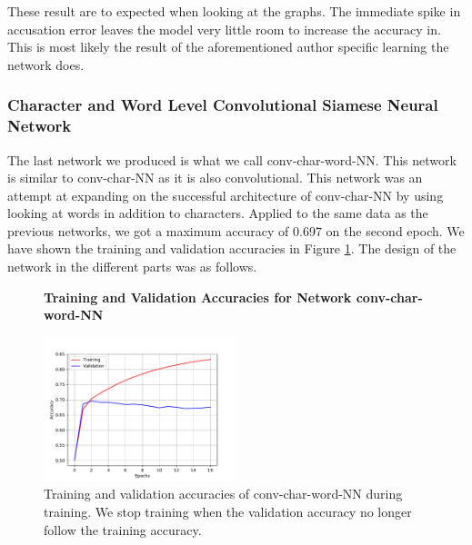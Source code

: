 These result are to expected when looking at the graphs. The immediate spike in
accusation error leaves the model very little room to increase the accuracy in.
This is most likely the result of the aforementioned author specific learning
the network does.


\subsubsection{Character and Word Level Convolutional Siamese Neural Network}
\label{subsubsec:conv_char_word_nn}

The last network we produced is what we call \gls{conv-char-word-NN}. This
network is similar to \gls{conv-char-NN} as it is also convolutional. This
network was an attempt at expanding on the successful architecture of
\gls{conv-char-NN} by using looking at words in addition to characters. Applied
to the same data as the previous networks, we got a maximum accuracy of 0.697 on
the second epoch. We have shown the training and validation accuracies in Figure
\ref{fig:conv-char-word-NN-training}. The design of the network in the different
parts was as follows.

\begin{figure}
    \centering
    \textbf{Training and Validation Accuracies for Network \gls{conv-char-word-NN}}\par\medskip
    \includegraphics[width=0.5\textwidth]{./pictures/experiments/conv_char_word_nn/training}
    \caption{Training and validation accuracies of \gls{conv-char-word-NN}
        during training. We stop training when the validation accuracy no longer
        follow the training accuracy.}
    \label{fig:conv-char-word-NN-training}
\end{figure}


